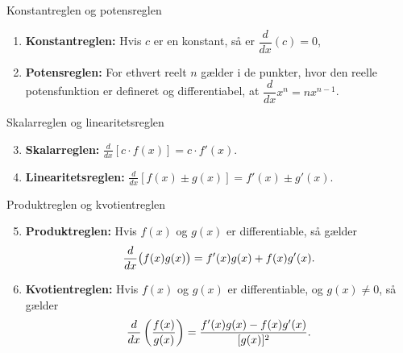 \begin{theorem}{Konstantreglen og potensreglen}
    \begin{enumerate}
        \item \textbf{Konstantreglen:} Hvis $c$ er en konstant, så er $\dfrac{d}{dx}(c) = 0$, \vspace{0.5em}
        \item \textbf{Potensreglen:} For ethvert reelt $n$ gælder i de punkter, hvor den reelle potensfunktion er defineret og differentiabel, at $\dfrac{d}{dx}x^n = n x^{n - 1}$. \vspace{0.5em}
    \end{enumerate}
\end{theorem}

\begin{theorem}{Skalarreglen og linearitetsreglen}
    \begin{enumerate}
        \setcounter{enumi}{2}
        \vspace{0.5em}
        \item \textbf{Skalarreglen:} \( \frac{d}{dx}[c \cdot f(x)] = c \cdot f'(x) \). \vspace{0.5em}
        \item \textbf{Linearitetsreglen:} \( \frac{d}{dx}[f(x) \pm g(x)] = f'(x) \pm g'(x) \). \vspace{0.5em}
    \end{enumerate}
\end{theorem}

\begin{theorem}{Produktreglen og kvotientreglen}
    \begin{enumerate}
        \setcounter{enumi}{4}
        \vspace{0.5em}
        \item \textbf{Produktreglen:} Hvis \(f(x)\) og \(g(x)\) er differentiable, så gælder \vspace{0.5em}
        \[
        \frac{d}{dx}\big(f(x)g(x)\big)=f'(x)g(x)+f(x)g'(x). \vspace{0.5em}
        \] \vspace{0.5em}
        \item \textbf{Kvotientreglen:} Hvis \(f(x)\) og \(g(x)\) er differentiable, og \(g(x)\neq0\), så gælder
        \vspace{0.5em}
        \[
        \frac{d}{dx}\left(\frac{f(x)}{g(x)}\right)=\frac{f'(x)g(x)-f(x)g'(x)}{[g(x)]^2}. \vspace{0.5em}
        \]
    \end{enumerate}
\end{theorem}

